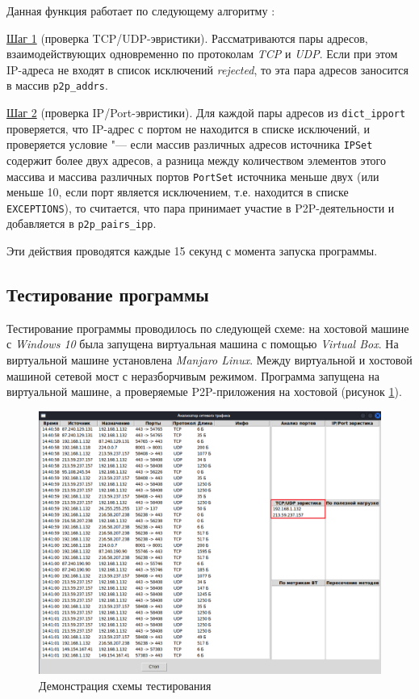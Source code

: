 \documentclass[bachelor, och, coursework]{SCWorks}
\begin{document}
Данная функция работает по следующему алгоритму \cite{algorithm}:

\underline{Шаг 1} (проверка TCP/UDP-эвристики). 
Рассматриваются пары адресов, взаимодействующих одновременно по протоколам \textit{TCP} и \textit{UDP}. 
Если при этом IP-адреса не входят в список исключений \textit{rejected}, то эта пара адресов заносится в массив \texttt{p2p_addrs}.

\underline{Шаг 2} (проверка IP/Port-эвристики). 
Для каждой пары адресов из \texttt{dict_ipport} проверяется, что IP-адрес с портом не находится в списке исключений, и проверяется условие "--- если массив различных адресов источника \texttt{IPSet} содержит более двух адресов, а разница между количеством элементов этого массива и массива различных портов \texttt{PortSet}
источника меньше двух (или меньше 10, если порт является исключением, т.е. находится в списке \texttt{EXCEPTIONS}), то считается, что пара принимает участие в P2P-деятельности и добавляется в \texttt{p2p_pairs_ipp}.

Эти действия проводятся каждые 15 секунд с момента запуска программы.

\subsection{Тестирование программы}
Тестирование программы проводилось по следующей схеме: на хостовой машине с \textit{Windows 10} была запущена виртуальная машина с помощью \textit{Virtual Box}. На виртуальной машине установлена \textit{Manjaro Linux}. Между виртуальной и хостовой машиной сетевой мост с неразборчивым режимом. Программа запущена на виртуальной машине, а проверяемые P2P-приложения на хостовой (рисунок \ref{test1}).

\begin{figure}[H]
    \centering
    \includegraphics[width=0.999\textwidth]{test1.png}
    \caption{Демонстрация схемы тестирования}
    \label{test1}
\end{figure}
\end{document}
